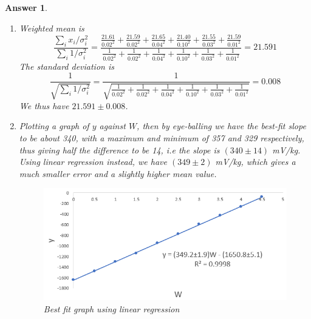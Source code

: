 \documentclass[a4paper]{article}
\newtheorem{ans}{Answer}[section]
\theoremstyle{new}
\begin{document}
\begin{ans}\leavevmode
\begin{enumerate}[label=(\alph*)]
\item Weighted mean is
$$\frac{\sum_i x_i/\sigma_i^2}{\sum_i1/\sigma_i^2}=\frac{\frac{21.61}{0.02^2}+\frac{21.59}{0.02^2}+\frac{21.65}{0.04^2}+\frac{21.40}{0.10^2}+\frac{21.55}{0.03^2}+\frac{21.59}{0.01^2}}{\frac{1}{0.02^2}+\frac{1}{0.02^2}+\frac{1}{0.04^2}+\frac{1}{0.10^2}+\frac{1}{0.03^2}+\frac{1}{0.01^2}}=21.591$$
The standard deviation is
$$\frac{1}{\sqrt{\sum_i1/\sigma_i^2}}=\frac{1}{\sqrt{\frac{1}{0.02^2}+\frac{1}{0.02^2}+\frac{1}{0.04^2}+\frac{1}{0.10^2}+\frac{1}{0.03^2}+\frac{1}{0.01^2}}}=0.008$$
We thus have $21.591\pm0.008$.
\item Plotting a graph of $y$ against $W$, then by eye-balling we have the best-fit slope to be about 340, with a maximum and minimum of 357 and 329 respectively, thus giving half the difference to be 14, i.e the slope is $(340\pm 14)$ mV/kg. Using linear regression instead, we have $(349\pm 2)$ mV/kg, which gives a much smaller error and a slightly higher mean value.
\begin{figure}[H]
    \centering
    \includegraphics[scale=0.65]{1_16.PNG}
    \caption{Best fit graph using linear regression}
\end{figure}
\end{enumerate}
\end{ans}
\end{document}
